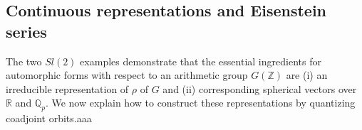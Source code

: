   \subsection{Continuous representations and Eisenstein series}
  The two $Sl(2)$ examples demonstrate that the essential ingredients for
  automorphic forms with respect to an arithmetic group $G(\mathbb{Z})$ are (i)
  an irreducible representation of $\rho$ of $G$ and (ii) corresponding
  spherical vectors over $\mathbb{R}$ and $\mathbb{Q}_p$. We now explain how to
  construct these representations by quantizing coadjoint orbits.aaa
